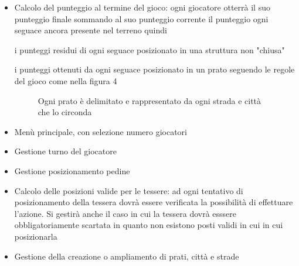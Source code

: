 \begin{itemize}
\item Calcolo del punteggio al termine del gioco: ogni giocatore otterrà il suo punteggio finale sommando al suo punteggio corrente il punteggio ogni seguace ancora presente nel terreno quindi

\subitem i punteggi residui di ogni seguace posizionato in una struttura non "chiusa"

\subitem i punteggi ottenuti da ogni seguace posizionato in un prato seguendo le regole del gioco come nella figura 4

\begin{figure}[]

    \caption{Ogni prato è delimitato e rappresentato da ogni strada e città che lo circonda}
    
\end{figure}

\end{itemize}
\begin{itemize}
\item Menù principale, con selezione numero giocatori
\end{itemize}
\begin{itemize}
\item Gestione turno del giocatore
\end{itemize}
\begin{itemize}
\item Gestione posizionamento pedine
\end{itemize}
\begin{itemize}
\item Calcolo delle posizioni valide per le tessere: ad ogni tentativo di posizionamento della tessera dovrà essere verificata la possibilità di effettuare l'azione. Si gestirà anche il caso in cui la tessera dovrà esssere obbligatoriamente scartata in quanto non esistono posti validi in cui in cui posizionarla
\end{itemize}
\begin{itemize}
\item Gestione della creazione o ampliamento di prati, città e strade
\end{itemize}

